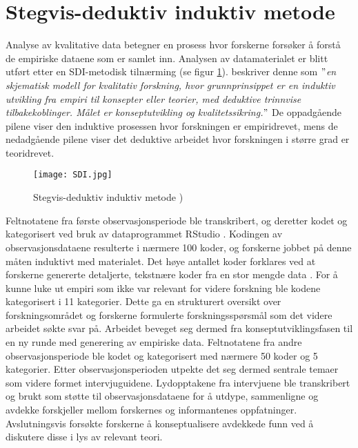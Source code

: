 \section{Stegvis-deduktiv induktiv metode}
\label{section:sdi} 
Analyse av kvalitative data betegner en prosess hvor forskerne forsøker å forstå de empiriske dataene som er samlet inn. Analysen av datamaterialet er blitt utført etter en SDI-metodisk tilnærming (se figur \ref{SDI}). \citet{Tjora} beskriver denne som \textit{$"$en skjematisk modell for kvalitativ forskning, hvor grunnprinsippet er en induktiv utvikling fra empiri til konsepter eller teorier, med deduktive trinnvise tilbakekoblinger. Målet er konseptutvikling og kvalitetssikring.$"$} De oppadgående pilene viser den induktive prosessen hvor forskningen er empiridrevet, mens de nedadgående pilene viser det deduktive arbeidet hvor forskningen i større grad er teoridrevet.

\begin{figure}[H]
\centering
\texttt{[image: SDI.jpg]}
\caption{Stegvis-deduktiv induktiv metode \citep{Tjora})}
\label{SDI}
\end{figure}

\noindent
Feltnotatene fra første observasjonsperiode ble transkribert, og deretter kodet og kategorisert ved bruk av dataprogrammet RStudio \citep{Rstudio}. Kodingen av observasjonsdataene resulterte i nærmere 100 koder, og forskerne jobbet på denne måten induktivt med materialet. Det høye antallet koder forklares ved at forskerne genererte detaljerte, tekstnære koder fra en stor mengde data \citep{Tjora}. For å kunne luke ut empiri som ikke var relevant for videre forskning ble kodene kategorisert i 11 kategorier. Dette ga en strukturert oversikt over forskningsområdet og forskerne formulerte forskningsspørsmål som det videre arbeidet søkte svar på. Arbeidet beveget seg dermed fra konseptutviklingsfasen til en ny runde med generering av empiriske data. Feltnotatene fra andre observasjonsperiode ble kodet og kategorisert med nærmere 50 koder og 5 kategorier. Etter observasjonsperioden utpekte det seg dermed sentrale temaer som videre formet intervjuguidene. Lydopptakene fra intervjuene ble transkribert og brukt som støtte til observasjonsdataene for å utdype, sammenligne og avdekke forskjeller mellom forskernes og informantenes oppfatninger. Avslutningsvis forsøkte forskerne å konseptualisere avdekkede funn ved å diskutere disse i lys av relevant teori. 


